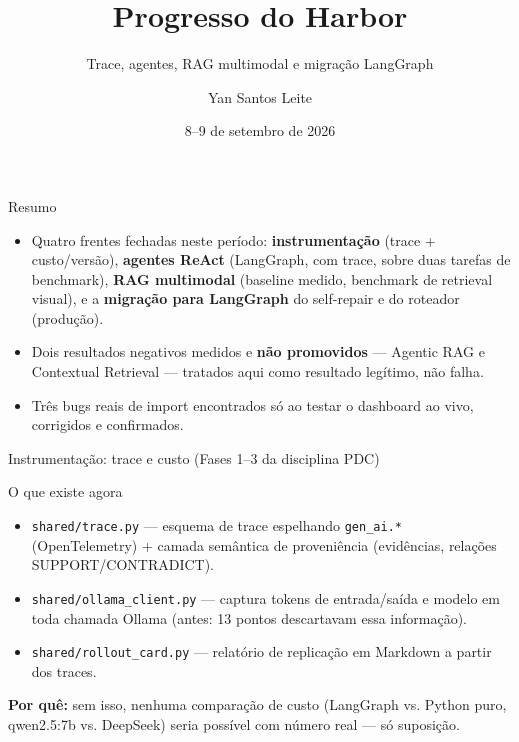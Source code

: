 \documentclass{beamer}
\title{Progresso do Harbor}
\subtitle{Trace, agentes, RAG multimodal e migração LangGraph}
\author{Yan Santos Leite}
\date{8--9 de setembro de 2026}
\newenvironment{numerobloco}[1]{\begin{block}{#1}}{\end{block}}
\begin{document}
\frame{\titlepage}

\begin{frame}{Resumo}
  \begin{itemize}
    \item Quatro frentes fechadas neste período: \textbf{instrumentação}
      (trace + custo/versão), \textbf{agentes ReAct} (LangGraph, com trace, sobre
      duas tarefas de benchmark), \textbf{RAG multimodal} (baseline medido, benchmark
      de retrieval visual), e a \textbf{migração para LangGraph} do self-repair e do
      roteador (produção).
    \item Dois resultados negativos medidos e \textbf{não promovidos} — Agentic RAG e
      Contextual Retrieval — tratados aqui como resultado legítimo, não falha.
    \item Três bugs reais de import encontrados só ao testar o dashboard ao vivo,
      corrigidos e confirmados.
  \end{itemize}
\end{frame}

\begin{frame}{Instrumentação: trace e custo (Fases 1--3 da disciplina PDC)}
  \begin{numerobloco}{O que existe agora}
    \begin{itemize}
      \item \texttt{shared/trace.py} — esquema de trace espelhando \texttt{gen\_ai.*}
        (OpenTelemetry) + camada semântica de proveniência (evidências, relações
        SUPPORT/CONTRADICT).
      \item \texttt{shared/ollama\_client.py} — captura tokens de entrada/saída e
        modelo em toda chamada Ollama (antes: 13 pontos descartavam essa informação).
      \item \texttt{shared/rollout\_card.py} — relatório de replicação em Markdown a
        partir dos traces.
    \end{itemize}
  \end{numerobloco}

  \pause
  \textbf{Por quê:} sem isso, nenhuma comparação de custo (LangGraph vs. Python puro,
  qwen2.5:7b vs. DeepSeek) seria possível com número real — só suposição.
\end{frame}
\end{document}

